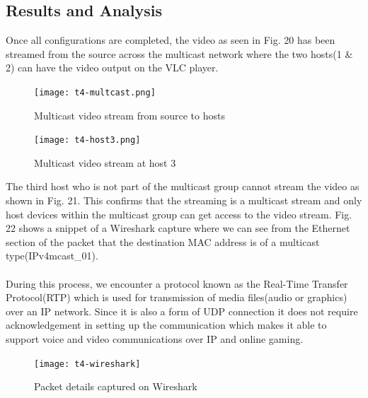 \documentclass{article}
\begin{document}
\subsection{Results and Analysis}
Once all configurations are completed, the video as seen in Fig. 20 has been streamed from the source across the multicast network where the two hosts(1 \& 2) can have the video output on the VLC player.
	\begin{figure}[h]
		\centering
		\texttt{[image: t4-multcast.png]}
		\caption{Multicast video stream from source to hosts}
		\label{fig:t4-4}
	\end{figure}
	\begin{figure}[h]
		\centering
		\texttt{[image: t4-host3.png]}
		\caption{Multicast video stream at host 3}
		\label{fig:t4-5}
	\end{figure}
\par The third host who is not part of the multicast group cannot stream the video as shown in Fig. 21. This confirms that the streaming is a multicast stream and only host devices within the multicast group can get access to the video stream. Fig. 22 shows a snippet of a Wireshark capture where we can see from the Ethernet section of the packet that the destination MAC address is of a multicast type(IPv4mcast\_01). \\\\ During this process, we encounter a protocol known as the Real-Time Transfer Protocol(RTP) which is used for transmission of media files(audio or graphics) over an IP network. Since it is also a form of UDP connection it does not require acknowledgement in setting up the communication which makes it able to support voice and video communications over IP and online gaming.

\newpage
	\begin{figure}[h]
		\centering
		\texttt{[image: t4-wireshark]}
		\caption{Packet details captured on Wireshark}
		\label{fig:t4-6}
	\end{figure}
	
\end{document}
